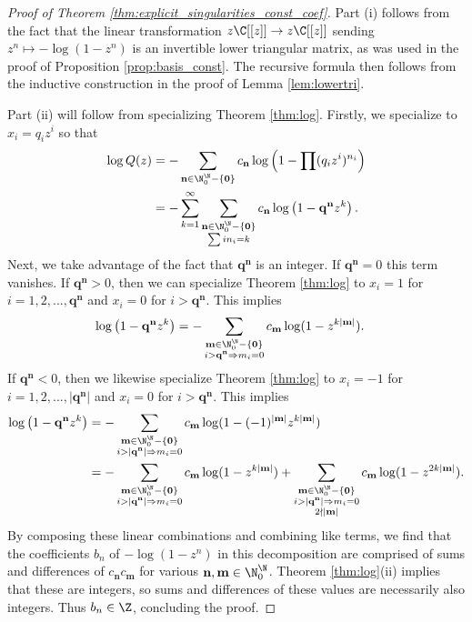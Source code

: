 \documentclass[12pt]{amsart}
\theoremstyle{plain}
\begin{document}
\begin{proof}[Proof of Theorem \ref{thm:explicit_singularities_const_coef}]
    Part (i) follows from the fact that the linear transformation $z\C[[z]]\to z\C[[z]]$ sending $z^n\mapsto -\log(1-z^n)$ is an invertible lower triangular matrix, as was used in the proof of Proposition \ref{prop:basis_const}. The recursive formula then follows from the inductive construction in the proof of Lemma \ref{lem:lowertri}.

    Part (ii) will follow from specializing Theorem \ref{thm:log}. Firstly, we specialize to $x_i = q_iz^i$ so that
    \begin{align*}
        \log Q(z) &= -\sum_{\mathbf{n}\in \N^\N_0-\{\mathbf{0}\}} c_\mathbf{n} \log\left(1 - \prod (q_i z^i)^{n_i}\right)\\
        &=-\sum_{k=1}^\infty\sum_{\substack{\mathbf{n}\in \N^\N_0-\{\mathbf{0}\}\\\sum in_i = k}} c_\mathbf{n} \log\left(1 - \mathbf{q}^{\mathbf{n}} z^k\right).
    \end{align*}
    Next, we take advantage of the fact that $\mathbf{q}^\mathbf{n}$ is an integer. If $\mathbf{q}^\mathbf{n}=0$ this term vanishes. If $\mathbf{q}^\mathbf{n}>0$, then we can specialize Theorem \ref{thm:log} to $x_i = 1$ for $i=1,2,...,\mathbf{q}^\mathbf{n}$ and $x_i = 0$ for $i>\mathbf{q}^\mathbf{n}$. This implies
    \begin{align*}
        \log\left(1 - \mathbf{q}^{\mathbf{n}} z^k\right) &= -\sum_{\substack{\mathbf{m}\in \N^\N_0-\{\mathbf{0}\}\\i>\mathbf{q}^{\mathbf{n}}\Rightarrow m_i =0}} c_\mathbf{m}\log(1 - z^{k|\mathbf{m}|}).
    \end{align*}
    If $\mathbf{q}^\mathbf{n}<0$, then we likewise specialize Theorem \ref{thm:log} to $x_i = -1$ for $i=1,2,...,|\mathbf{q}^\mathbf{n}|$ and $x_i = 0$ for $i>\mathbf{q}^\mathbf{n}$. This implies
    \begin{align*}
        \log\left(1 - \mathbf{q}^{\mathbf{n}} z^k\right) &= -\sum_{\substack{\mathbf{m}\in \N^\N_0-\{\mathbf{0}\}\\i>|\mathbf{q}^{\mathbf{n}}|\Rightarrow m_i =0}} c_\mathbf{m}\log(1 - (-1)^{|\mathbf{m}|}z^{k|\mathbf{m}|})\\
        &=-\sum_{\substack{\mathbf{m}\in \N^\N_0-\{\mathbf{0}\}\\i>|\mathbf{q}^{\mathbf{n}}|\Rightarrow m_i =0}} c_\mathbf{m}\log(1 - z^{k|\mathbf{m}|})+
        \sum_{\substack{\mathbf{m}\in \N^\N_0-\{\mathbf{0}\}\\i>|\mathbf{q}^{\mathbf{n}}|\Rightarrow m_i =0\\2\nmid |\mathbf{m}|}} c_\mathbf{m}\log(1 - z^{2k|\mathbf{m}|}).
    \end{align*}
    By composing these linear combinations and combining like terms, we find that the coefficients $b_n$ of $-\log(1-z^n)$ in this decomposition are comprised of sums and differences of $c_{\mathbf{n}}c_{\mathbf{m}}$ for various $\mathbf{n},\mathbf{m}\in \N^\N_0$. Theorem \ref{thm:log}(ii) implies that these are integers, so sums and differences of these values are necessarily also integers. Thus $b_n\in \Z$, concluding the proof.
\end{proof}
\end{document}
